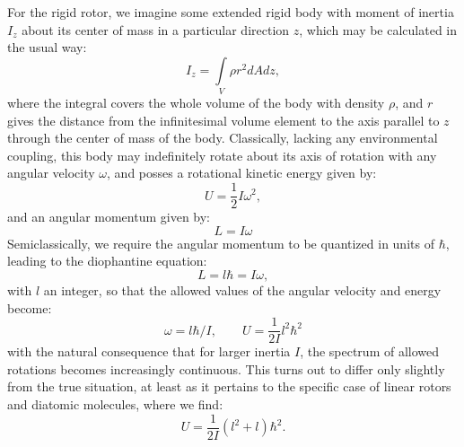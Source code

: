For the rigid rotor, we imagine some extended rigid body with moment of inertia $I_z$ about its center of mass in a particular direction $z$, which may be calculated in the usual way:
\begin{equation}
I_z = \int\limits_V\rho r^2 dAdz,\label{izsimp}
\end{equation}
where the integral covers the whole volume of the body with density $\rho$, and $r$ gives the distance from the infinitesimal volume element to the axis parallel to $z$ through the center of mass of the body.
Classically, lacking any environmental coupling, this body may indefinitely rotate about its axis of rotation with any angular velocity $\omega$, and posses a rotational kinetic energy given by:
\begin{equation}
U=\frac{1}{2}I\omega^2,
\end{equation}
and an angular momentum given by:
\begin{equation}
L= I\omega
\end{equation}
Semiclassically, we require the angular momentum to be quantized in units of $\hbar$, leading to the diophantine equation:
\begin{equation}
L = l\hbar = I\omega,
\end{equation}
with $l$ an integer, so that the allowed values of the angular velocity and energy become:
\begin{equation}
\omega = l\hbar/I, \qquad U = \frac{1}{2I}l^2\hbar^2
\end{equation}
with the natural consequence that for larger inertia $I$, the spectrum of allowed rotations becomes increasingly continuous.
This turns out to differ only slightly from the true situation, at least as it pertains to the specific case of linear rotors and diatomic molecules, where we find:
\begin{equation}
U = \frac{1}{2I}(l^2 + l)\hbar^2.
\end{equation}


